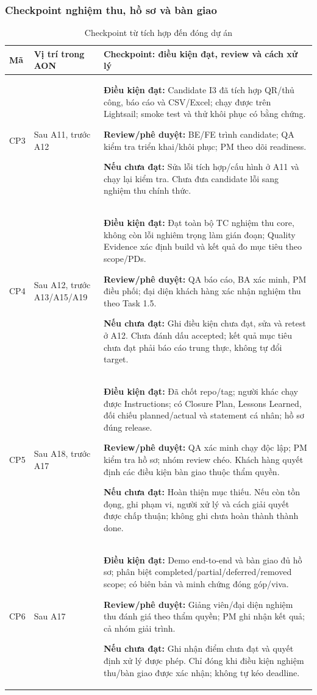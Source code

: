 \subsubsection{Checkpoint nghiệm thu, hồ sơ và bàn giao}
\begin{table}[H]
\centering
\caption{Checkpoint từ tích hợp đến đóng dự án}
\footnotesize
\renewcommand{\arraystretch}{1.15}
\begin{tabularx}{\linewidth}{|p{0.9cm}|p{2.5cm}|>{\raggedright\arraybackslash}X|}
\hline
\textbf{Mã} & \textbf{Vị trí trong AON} & \textbf{Checkpoint: điều kiện đạt, review và cách xử lý} \\ \hline
CP3 & Sau A11, trước A12 & \textbf{Điều kiện đạt:} Candidate I3 đã tích hợp QR/thủ công, báo cáo và CSV/Excel; chạy được trên Lightsail; smoke test và thử khôi phục có bằng chứng. \par \textbf{Review/phê duyệt:} BE/FE trình candidate; QA kiểm tra triển khai/khôi phục; PM theo dõi readiness. \par \textbf{Nếu chưa đạt:} Sửa lỗi tích hợp/cấu hình ở A11 và chạy lại kiểm tra. Chưa đưa candidate lỗi sang nghiệm thu chính thức. \\ \hline
CP4 & Sau A12, trước A13/A15/A19 & \textbf{Điều kiện đạt:} Đạt toàn bộ TC nghiệm thu core, không còn lỗi nghiêm trọng làm gián đoạn; Quality Evidence xác định build và kết quả đo mục tiêu theo scope/PDs. \par \textbf{Review/phê duyệt:} QA báo cáo, BA xác minh, PM điều phối; đại diện khách hàng xác nhận nghiệm thu theo Task 1.5. \par \textbf{Nếu chưa đạt:} Ghi điều kiện chưa đạt, sửa và retest ở A12. Chưa đánh dấu accepted; kết quả mục tiêu chưa đạt phải báo cáo trung thực, không tự đổi target. \\ \hline
CP5 & Sau A18, trước A17 & \textbf{Điều kiện đạt:} Đã chốt repo/tag; người khác chạy được Instructions; có Closure Plan, Lessons Learned, đối chiếu planned/actual và statement cá nhân; hồ sơ đúng release. \par \textbf{Review/phê duyệt:} QA xác minh chạy độc lập; PM kiểm tra hồ sơ; nhóm review chéo. Khách hàng quyết định các điều kiện bàn giao thuộc thẩm quyền. \par \textbf{Nếu chưa đạt:} Hoàn thiện mục thiếu. Nếu còn tồn đọng, ghi phạm vi, người xử lý và cách giải quyết được chấp thuận; không ghi chưa hoàn thành thành done. \\ \hline
CP6 & Sau A17 & \textbf{Điều kiện đạt:} Demo end-to-end và bàn giao đủ hồ sơ; phân biệt completed/partial/deferred/removed scope; có biên bản và minh chứng đóng góp/viva. \par \textbf{Review/phê duyệt:} Giảng viên/đại diện nghiệm thu đánh giá theo thẩm quyền; PM ghi nhận kết quả; cả nhóm giải trình. \par \textbf{Nếu chưa đạt:} Ghi nhận điểm chưa đạt và quyết định xử lý được phép. Chỉ đóng khi điều kiện nghiệm thu/bàn giao được xác nhận; không tự kéo deadline. \\ \hline
\end{tabularx}
\end{table}

